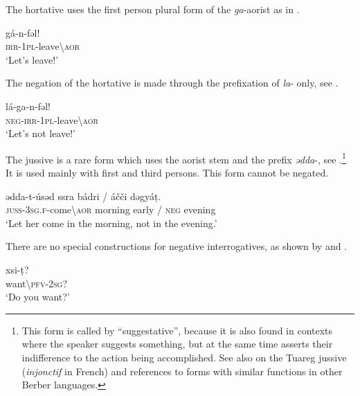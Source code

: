 \documentclass[output=paper,colorlinks,citecolor=brown]{langscibook}
\begin{document}
The hortative uses the first person plural form of the \textit{ga}{}-aorist as in .


\ea\label{ex:siw:13}
    \gll g\'{a}-n-fəl! \\
         \textsc{irr-1pl}-leave{\textbackslash}\textsc{aor}\\
    \glt  ‘Let’s leave!’
\z

The negation of the hortative is made through the prefixation of \textit{la}- only, see .

\ea\label{ex:siw:14}
        \gll lá-ga-n-fəl!  \\
             \textsc{neg-irr-1pl}-leave{\textbackslash}\textsc{aor} \\
        \glt‘Let’s not leave!’  

\z


The jussive is a rare form which uses the aorist stem and the prefix \textit{ədda}{}-, see .\footnote{This form is called by \citet[192--193]{Souag2013} “suggestative”, because it is also found in contexts where the speaker suggests something, but at the same time asserts their indifference to the action being accomplished. See also \citet[13]{Prasse1973} on the Tuareg jussive (\textit{injonctif} in French) and references to forms with similar functions in other Berber languages.} It is used mainly with first and third persons.
This form cannot be negated.


\ea\label{ex:siw:15}
    \gll ədda-t-úsəd ssra b\'{a}dri / áčči dəgyáṭ.\\
         \textsc{juss-3sg.f-}come{\textbackslash}\textsc{aor} morning early / \textsc{neg} evening \\
    \glt ‘Let her come in the morning, not in the evening.’
    \z


There are no special constructions for negative interrogatives, as shown by  and .

\ea\label{ex:siw:16}
    \ea\label{ex:siw:16a}
        \gll xsi-ṭ?  \\ 
             want{\textbackslash}\textsc{pfv-2sg}? \\
        \glt ‘Do you want?’
    
\end{document}
